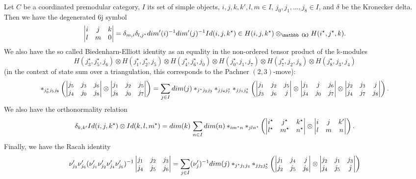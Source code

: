 \begin{proposition}\label{prop/basic-equalities-of-6j-symbols}
  Let $C$ be a coordinated premodular category, $I$ its set of
  simple objects, $i, j, k, k', l, m \in I$,
  $j_{0}, j_{1}, \ldots, j_{8} \in I$, and $\delta$ be the Kronecker
  delta. Then we have the degenerated $6$j symbol
  \begin{equation}\label{eqn/degenerated-6j}
    \normalizedSixJSymbol{i}{j}{k}{l}{m}{0} = \delta_{m,i} \delta_{l,j^{\star}}dim'(i)^{-1}dim'(j)^{-1}Id(i,j,k^{\star})
    \in H(i,j,k^{\star}) \otimes_{\mathbb{k}} H(i^{\star}, j^{\star}, k)
    .
  \end{equation}
  We also have the so called Biedenharn-Elliott identity as an
  equality in the non-ordered tensor product of the
  $\mathbb{k}$-modules
  $$
  H(j_{3}^{\star}, j_{5}^{\star}, j_{6}) \otimes
  H(j_{1}^{\star}, j_{2}^{\star}, j_{5}) \otimes
  H(j_{4}^{\star}, j_{6}^{\star}, j_{0}) \otimes
  H(j_{0}^{\star}, j_{1}, j_{7}) \otimes
  H(j_{7}^{\star}, j_{2}, j_{8}) \otimes
  H(j_{8}^{\star}, j_{3}, j_{4})
  $$
  (in the context of state sum over a triangulation, this
  corresponds to the Pachner $(2,3)$-move):
  \begin{equation}\label{eqn/Biedenharn-Elliot-identity}
    \ast_{j_{0}^{\star}j_{5}j_{8}}
    \left(
      \begin{vmatrix} j_{5} & j_{3} & j_{6} \\ j_{4} & j_{0} & j_{8} \\ \end{vmatrix} \otimes \begin{vmatrix} j_{1} & j_{2} & j_{5} \\ j_{8} & j_{0} & j_{7} \\ \end{vmatrix}
    \right)
    =
    \sum_{j \in I} dim(j)
    \ast_{j^{\star}j_{2}j_{3}}\ast_{jj_{4}j_{7}^{\star}}\ast_{jj_{1}j_{6}^{\star}}
    \left(
      \begin{vmatrix} j_{1} & j_{2} & j_{5} \\ j_{3} & j_{6} & j \\ \end{vmatrix} \otimes
      \begin{vmatrix} j_{1} & j & j_{6} \\ j_{4} & j_{0} & j_{7} \\ \end{vmatrix} \otimes
      \begin{vmatrix} j_{2} & j_{3} & j \\ j_{4} & j_{7} & j_{8} \\ \end{vmatrix}
    \right).
  \end{equation}
  We also have the orthonormality relation
  \begin{equation}\label{eqn/orthonormality-relation}
    \delta_{k,k'} Id(i,j,k^{\star}) \otimes Id(k,l,m^{\star})
    =
    dim(k)\,\sum_{n \in I} dim(n) \ast_{im^{\star}n} \ast_{jln^{\star}}
    \left(
      \begin{vmatrix} i^{\star} & j^{\star} & k^{\star} \\ l^{\star} & m^{\star} & n^{\star} \\ \end{vmatrix} \otimes
      \begin{vmatrix} i & j & k' \\ l & m & n \\ \end{vmatrix}
    \right).
  \end{equation}
  Finally, we have the Racah identity
  \begin{equation}\label{eqn/Racah-identity}
    \nu'_{j_{3}} \nu'_{j_{6}} (\nu'_{j_{1}} \nu'_{j_{2}} \nu'_{j_{4}} \nu'_{j_{5}})^{-1}
    \begin{vmatrix} j_{1} & j_{2} & j_{3} \\ j_{4} & j_{5} & j_{6} \\ \end{vmatrix}
    =
    \sum_{j \in I} (\nu'_{j})^{-1} dim(j) \ast_{j^{\star}j_{1}j_{4}} \ast_{jj_{2}j_{5}^{\star}}
    \left(
      \begin{vmatrix} j_{1} & j_{4} & j \\ j_{2} & j_{5} & j_{6} \\ \end{vmatrix} \otimes
      \begin{vmatrix} j_{2} & j_{1} & j_{3} \\ j_{4} & j_{5} & j \\ \end{vmatrix}
    \right)
  \end{equation}
\end{proposition}

